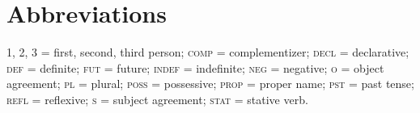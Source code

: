 \documentclass[output=paper]{LSP/langsci}
\begin{document}
\section*{Abbreviations}
1, 2, 3 = first, second, third person; \textsc{comp} = complementizer; \textsc{decl} = declarative; \textsc{def} = definite; \textsc{fut} = future; \textsc{indef} = indefinite; \textsc{neg} = negative; \textsc{o} = object agreement; \textsc{pl} = plural; \textsc{poss} = possessive; \textsc{prop} = proper name; \textsc{pst} = past tense; \textsc{refl} = reflexive; \textsc{s} = subject agreement; \textsc{stat} = stative verb.
 
 \printbibliography[heading=subbibliography,notkeyword=this]
\end{document}
